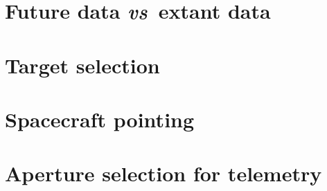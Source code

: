 \documentclass[12pt]{article}
\newcommand{\foreign}[1]{\textit{#1}}
\newcommand{\vs}{\foreign{vs}}
\begin{document}
\section{Future data \vs\ extant data}\label{sec:future}

\section{Target selection}\label{sec:target}

\section{Spacecraft pointing}\label{sec:pointing}

\section{Aperture selection for telemetry}\label{sec:telemetry}
\end{document}
